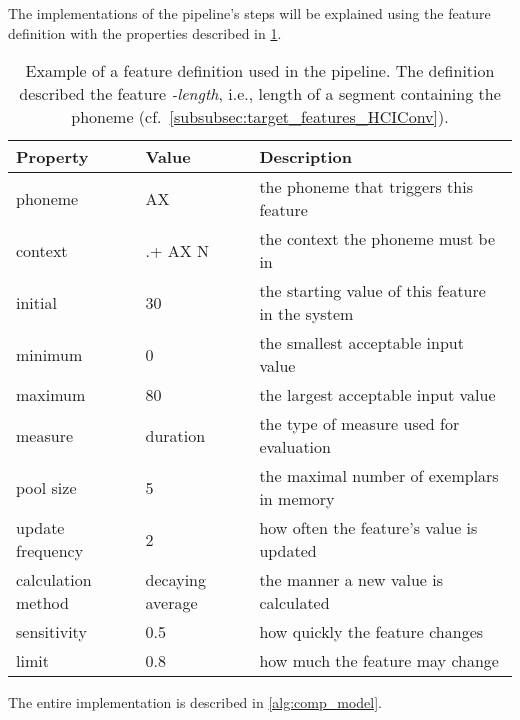 The implementations of the pipeline's steps will be explained using the feature definition with the properties described in \cref{tab:feature_definition}.
%
\begin{table}[t]
	\centering
	\caption[Feature definition example]
		{Example of a feature definition used in the pipeline.
		 The definition described  the feature \emph{-length}, i.e., length of a segment containing the phoneme \textipa{[@]} (cf.\ \cref{subsubsec:target_features_HCIConv}).}
	\label{tab:feature_definition}
	\begin{tabularx}{\linewidth}{Xll}
		\toprule
		Property			& Value				& Description\\
		\midrule
		phoneme				& AX				& the phoneme that triggers this feature\\
		context				& .+ AX N			& the context the phoneme must be in\\
		initial				& 30				& the starting value of this feature in the system\\
		minimum				& 0					& the smallest acceptable input value\\
		maximum				& 80				& the largest acceptable input value\\
		measure				& duration			& the type of measure used for evaluation\\
		pool size			& 5					& the maximal number of exemplars in memory\\
		update frequency	& 2					& how often the feature's value is updated\\
		calculation method	& decaying average  & the manner a new value is calculated\\
		sensitivity			& 0.5				& how quickly the feature changes\\
		limit				& 0.8				& how much the feature may change\\
		\bottomrule
	\end{tabularx}
\end{table}
%
%
The entire implementation is described in \cref{alg:comp_model}.
%
\addtocounter{equation}{1}

